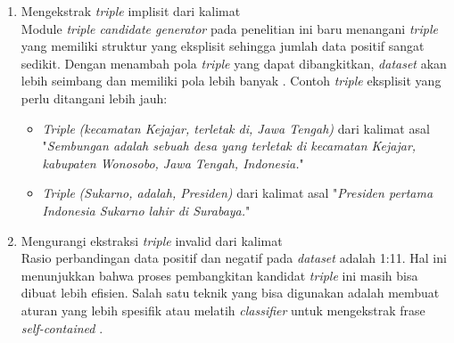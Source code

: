 \begin{enumerate}
	\item Mengekstrak \textit{triple} implisit dari kalimat \\
	Module \textit{triple candidate generator} pada penelitian ini baru menangani \textit{triple} yang memiliki struktur yang eksplisit sehingga jumlah data positif sangat sedikit. Dengan menambah pola \textit{triple} yang dapat dibangkitkan, \textit{dataset} akan lebih seimbang dan memiliki pola lebih banyak \citep{schmitz2012open}. Contoh \textit{triple} eksplisit yang perlu ditangani lebih jauh:
	\begin{itemize}
		\item \textit{Triple} \textit{(kecamatan Kejajar, terletak di, Jawa Tengah)} dari kalimat asal "\textit{Sembungan adalah sebuah desa yang terletak di kecamatan Kejajar, kabupaten Wonosobo, Jawa Tengah, Indonesia.}"		
		\item \textit{Triple} \textit{(Sukarno, adalah, Presiden)} dari kalimat asal "\textit{Presiden pertama Indonesia Sukarno lahir di Surabaya.}"
	\end{itemize} 
	
	\item Mengurangi ekstraksi \textit{triple} invalid dari kalimat \\
	Rasio perbandingan data positif dan negatif pada \textit{dataset} adalah 1:11. Hal ini menunjukkan bahwa proses pembangkitan kandidat \textit{triple} ini masih bisa dibuat lebih efisien. Salah satu teknik yang bisa digunakan adalah membuat aturan yang lebih spesifik atau melatih \textit{classifier} untuk mengekstrak frase \textit{self-contained} \citep{angeli2015leveraging}.
	
\end{enumerate}


